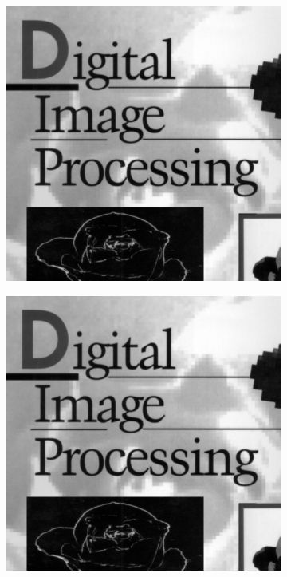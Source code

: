 \begin{figure}[h]
\begin{subfigure}[b]{0.3\linewidth}
		\caption{}
		\label{fig:5_gaussian_blur}
	\end{subfigure}
  	\begin{subfigure}[b]{0.3\linewidth}
		\includegraphics[width=\linewidth]{myfigure/p5/5_inverse_blur.png}
		\caption{}
		\label{fig:5_inverse_blur}
	\end{subfigure}
  	\begin{subfigure}[b]{0.3\linewidth}
		\includegraphics[width=\linewidth]{myfigure/p5/5_wiener_blur.png}

\end{subfigure}
\end{figure}
